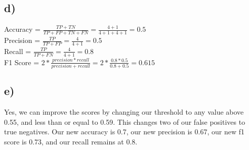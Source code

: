 \documentclass[12pt, letterpaper]{article}
\begin{document}
\subsection*{d)} Accuracy = $\frac{TP + TN}{TP+FP+TN+FN} = \frac{4+1}{4+1+4+1} = 0.5$\\
Precision = $\frac{TP}{TP+FP} = \frac{4}{4+1} = 0.5$\\
Recall = $\frac{TP}{TP+FN} = \frac{4}{4+1} = 0.8$\\
F1 Score = $2 * \frac{precision * recall}{precision+recall} = 2*\frac{0.8*0.5}{0.8+0.5} = 0.615$

\subsection*{e)} Yes, we can improve the scores by changing our threshold to any value above 0.55, and less than or equal to 0.59.  This changes two of our false positives to true negatives. Our new accuracy is 0.7, our new precision is 0.67, our new f1 score is 0.73, and our recall remains at 0.8.

\newpage
\end{document}

